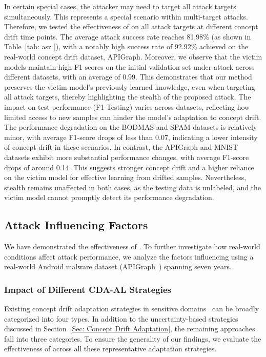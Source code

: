 In certain special cases, the attacker may need to target all attack targets simultaneously.
This represents a special scenario within multi-target attacks.
Therefore, we tested the effectiveness of \pandora on all attack targets at different concept drift time points.
The average attack success rate reaches 81.98\% (as shown in Table~\ref{tab: asz }), with a notably high success rate of 92.92\% achieved on the real-world concept drift dataset, APIGraph.  
Moreover, we observe that the victim models maintain high F1 scores on the initial validation set under attack across different datasets, with an average of 0.99.
This demonstrates that our method preserves the victim model’s previously learned knowledge, even when targeting all attack targets, thereby highlighting the stealth of the proposed attack.
The impact on test performance (F1-Testing) varies across datasets, reflecting how limited access to new samples can hinder the model’s adaptation to concept drift.
The performance degradation on the BODMAS and SPAM datasets is relatively minor, with average F1-score drops of less than 0.07, indicating a lower intensity of concept drift in these scenarios.
In contrast, the APIGraph and MNIST datasets exhibit more substantial performance changes, with average F1-score drops of around 0.14.
This suggests stronger concept drift and a higher reliance on the victim model for effective learning from drifted samples.
Nevertheless, \pandora stealth remains unaffected in both cases, as the testing data is unlabeled, and the victim model cannot promptly detect its performance degradation.

\subsection{Attack Influencing Factors}
\label{Sec: Attack Influencing Factors}

We have demonstrated the effectiveness of \pandora.
To further investigate how real-world conditions affect attack performance, we analyze the factors influencing \pandora using a real-world Android malware dataset (APIGraph~\cite{2020-CCS-APIGraph}) spanning seven years.

\subsubsection{Impact of Different CDA-AL Strategies}
Existing concept drift adaptation strategies in sensitive domains~\cite{2023-Usenix-chenyizhen,2022-SP-Trancending,2021-Usenix-CDAE} can be broadly categorized into four types. 
In addition to the uncertainty-based strategies discussed in Section~\ref{Sec: Concept Drift Adaptation}, the remaining approaches fall into three categories. 
To ensure the generality of our findings, we evaluate the effectiveness of \pandora across all these representative adaptation strategies.

